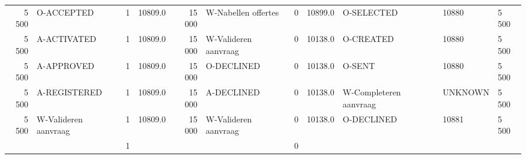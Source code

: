 \begin{tabular}{rlrlrlrllll}
5 500 & O-ACCEPTED & 1 & 10809.0 & 15 000 & W-Nabellen offertes & 0 & 10899.0 & O-SELECTED & 10880 & 5 500 \\
5 500 & A-ACTIVATED & 1 & 10809.0 & 15 000 & W-Valideren aanvraag & 0 & 10138.0 & O-CREATED & 10880 & 5 500 \\
5 500 & A-APPROVED & 1 & 10809.0 & 15 000 & O-DECLINED & 0 & 10138.0 & O-SENT & 10880 & 5 500 \\
5 500 & A-REGISTERED & 1 & 10809.0 & 15 000 & A-DECLINED & 0 & 10138.0 & W-Completeren aanvraag & UNKNOWN & 5 500 \\
5 500 & W-Valideren aanvraag & 1 & 10809.0 & 15 000 & W-Valideren aanvraag & 0 & 10138.0 & O-DECLINED & 10881 & 5 500 \\
 &  & 1 &  &  &  & 0 &  &  &  &  \\
\bottomrule
\end{tabular}
